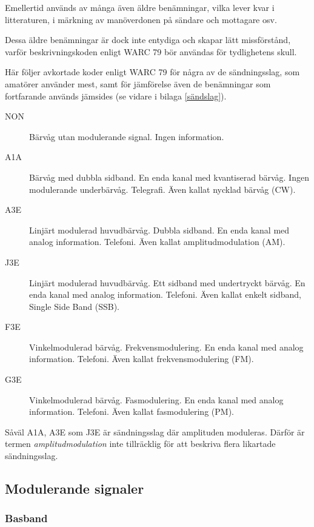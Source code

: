 Emellertid används av många även äldre benämningar, vilka lever kvar i
litteraturen, i märkning av manöverdonen på sändare och mottagare osv.

Dessa äldre benämningar är dock inte entydiga och skapar lätt missförstånd,
varför beskrivningskoden enligt WARC 79 bör användas för tydlighetens skull.

Här följer avkortade koder enligt WARC 79 för några av de sändningsslag, som
amatörer använder mest, samt för jämförelse även de benämningar som fortfarande
används jämsides (se vidare i bilaga \ref{sändslag}).

\begin{description}
\item[NON] Bärvåg utan modulerande signal. Ingen information.

\item[A1A] Bärvåg med dubbla sidband. En enda kanal med kvantiserad bärvåg.
Ingen modulerande underbärvåg. Telegrafi. Även kallat nycklad bärvåg (CW).

\item[A3E] Linjärt modulerad huvudbärvåg. Dubbla sidband. En enda kanal med
analog information. Telefoni. Även kallat amplitudmodulation (AM).

\item[J3E] Linjärt modulerad huvudbärvåg. Ett sidband med undertryckt bärvåg.
  En enda kanal med analog information. Telefoni.
  Även kallat enkelt sidband, Single Side Band (SSB).

\item[F3E] Vinkelmodulerad bärvåg. Frekvensmodulering. En enda kanal med analog
information. Telefoni. Även kallat frekvensmodulering (FM).

\item[G3E] Vinkelmodulerad bärvåg. Fasmodulering. En enda kanal med analog
information. Telefoni. Även kallat fasmodulering (PM).
\end{description}

Såväl A1A, A3E som J3E är sändningsslag där amplituden moduleras.
Därför är termen \emph{amplitudmodulation} inte tillräcklig för att beskriva
flera likartade sändningsslag.

\subsection{Modulerande signaler}

\subsubsection{Basband}

